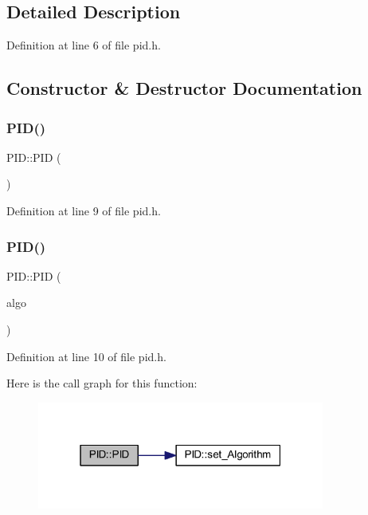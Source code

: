 \subsection{Detailed Description}


Definition at line 6 of file pid.\+h.



\subsection{Constructor \& Destructor Documentation}
\mbox{\label{class_p_i_d_a0311b6f7de348499ce24e53ba353514a}} 
\subsubsection{\texorpdfstring{PID()}{PID()}\hspace{0.1cm}{\footnotesize\ttfamily [1/4]}}
{\footnotesize\ttfamily P\+I\+D\+::\+P\+ID (\begin{DoxyParamCaption}{ }\end{DoxyParamCaption})\hspace{0.3cm}{\ttfamily [inline]}}



Definition at line 9 of file pid.\+h.

\mbox{\label{class_p_i_d_a3dec056234c6c626fd2265041b75b373}} 
\subsubsection{\texorpdfstring{PID()}{PID()}\hspace{0.1cm}{\footnotesize\ttfamily [2/4]}}
{\footnotesize\ttfamily P\+I\+D\+::\+P\+ID (\begin{DoxyParamCaption}\item[{\mbox{\hyperlink{class_p_i_d___algorithm}{P\+I\+D\+\_\+\+Algorithm}} $\ast$}]{algo }\end{DoxyParamCaption})\hspace{0.3cm}{\ttfamily [inline]}}



Definition at line 10 of file pid.\+h.

Here is the call graph for this function\+:
\nopagebreak
\begin{figure}[H]
\begin{center}
\leavevmode
\includegraphics[width=268pt]{class_p_i_d_a3dec056234c6c626fd2265041b75b373_cgraph}
\end{center}
\end{figure}
\mbox{\label{class_p_i_d_ac7e806bc5c09badd95a1209f13b0b2d9}} 
